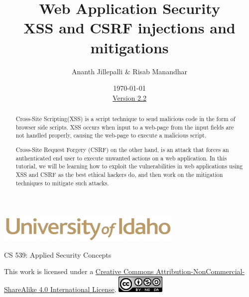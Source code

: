 \documentclass[12pt]{extarticle}
\begin{document}
\title{ Web Application Security\\XSS and CSRF injections and mitigations}
\author{Ananth Jillepalli \& Risab Manandhar}
\date{\today \\ \hyperref[changelog]{Version 2.2}}
\renewcommand{\abstractname}{Summary}
\begin{titlepage}
\maketitle
{}
\begin{center}
\includegraphics[scale=.5]{UofI}

\large{CS 539: Applied Security Concepts}

\vskip 40pt

\end{center}
\begin{abstract}
Cross-Site Scripting(XSS) is a script technique to send malicious code in the form of browser side scripts. XSS occurs when input to a web-page from the input fields are not handled properly, causing the web-page to execute a malicious script.

\vspace{4mm}
\noindent
Cross-Site Request Forgery (CSRF) on the other hand, is an attack that forces an authenticated end user to execute unwanted actions on a web application. In this tutorial, we will be learning how to exploit the vulnerabilities in web applications using XSS and CSRF as the best ethical hackers do, and then work on the mitigation techniques to mitigate such attacks.
\end{abstract}


\vfill
\begin{center}
This work is licensed under a \href{https://creativecommons.org/licenses/by-nc-sa/4.0/legalcode}{Creative Commons Attribution-NonCommercial-ShareAlike 4.0 International License}.
\vskip 10pt
\includegraphics[scale=.5]{cc}
\end{center}

\end{titlepage}

\end{document}
